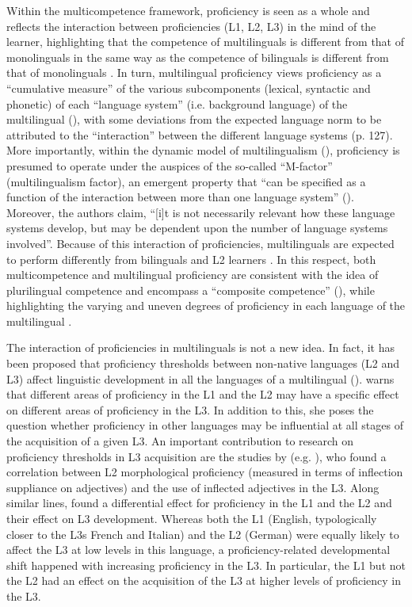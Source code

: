 \documentclass[output=paper]{../langscibook}
\begin{document}
Within the multicompetence framework, proficiency is seen as a whole and reflects the interaction between proficiencies (L1, L2, L3) in the mind of the learner, highlighting that the competence of multilinguals is different from that of monolinguals in the same way as the competence of bilinguals is different from that of monolinguals \citep{Grosjean2001}. In turn, multilingual proficiency views proficiency as a “cumulative measure” of the various subcomponents (lexical, syntactic and phonetic) of each “language system” (i.e. background language) of the multilingual (\citealt[109]{HerdinaJessner2002}), with some deviations from the expected language norm to be attributed to the “interaction” between the different language systems (p. 127). More importantly, within the dynamic model of multilingualism (\citealt{HerdinaJessner2002, Jessner2008Knowledge}), proficiency is presumed to operate under the auspices of the so-called “M-factor” (multilingualism factor), an emergent property that “can be specified as a function of the interaction between more than one language system” (\citealt[130]{HerdinaJessner2002}). Moreover, the authors claim, “[i]t is not necessarily relevant how these language systems develop, but may be dependent upon the number of language systems involved”. Because of this interaction of proficiencies, multilinguals are expected to perform differently from bilinguals and L2 learners \citep{Stratilaki2006}. In this respect, both multicompetence and multilingual proficiency are consistent with the idea of plurilingual competence and encompass a “composite competence” (\citealt[260]{CouncilofEurope2001}), while highlighting the varying and uneven degrees of proficiency in each language of the multilingual \citep{Coste1997}.

The interaction of proficiencies in multilinguals is not a new idea. In fact, it has been proposed that proficiency thresholds between non-native languages (L2 and L3) affect linguistic development in all the languages of a multilingual (\citealt{DeAngelisSelinker2001}). \citet{Cenoz2000} warns that different areas of proficiency in the L1 and the L2 may have a specific effect on different areas of proficiency in the L3. In addition to this, she poses the question whether proficiency in other languages may be influential at all stages of the acquisition of a given L3. An important contribution to research on proficiency thresholds in L3 acquisition are the studies by \citeauthor{Jaensch2011} (e.g. \citeyear{Jaensch2011}), who found a correlation between L2 morphological proficiency (measured in terms of inflection suppliance on adjectives) and the use of inflected adjectives in the L3. Along similar lines, \citet{Trévisiol2006} found a differential effect for proficiency in the L1 and the L2 and their effect on L3 development. Whereas both the L1 (English, typologically closer to the L3s French and Italian) and the L2 (German) were equally likely to affect the L3 at low levels in this language, a proficiency-related developmental shift happened with increasing proficiency in the L3. In particular, the L1 but not the L2 had an effect on the acquisition of the L3 at higher levels of proficiency in the L3.
\end{document}
